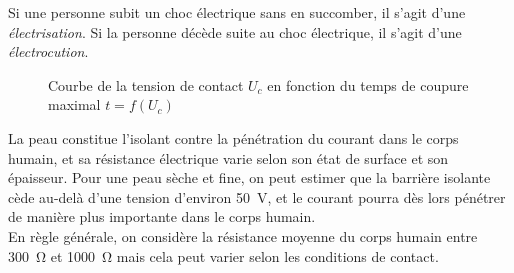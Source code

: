 Si une personne subit un choc électrique sans en succomber, il s'agit d'une \emph{électrisation}. Si la personne décède suite au choc électrique, il s'agit d'une \emph{électrocution}.

\begin{figure}[H]
\caption{Courbe de la tension de contact $U_c$ en fonction du temps de coupure maximal $t=f(U_c)$\label{graph:tension_contact_temps}}
\begin{center}
\end{center}
\end{figure}

La peau constitue l'isolant contre la pénétration du courant dans le corps humain, et sa résistance électrique varie selon son état de surface et son épaisseur. Pour une peau sèche et fine, on peut estimer que la barrière isolante cède au-delà d'une tension d'environ \SI{50}{\volt}, et le courant pourra dès lors pénétrer de manière plus importante dans le corps humain.\\
En règle générale, on considère la résistance moyenne du corps humain entre \SI{300}{\ohm} et \SI{1000}{\ohm} mais cela peut varier selon les conditions de contact.\supercite{Delahaye2015}

